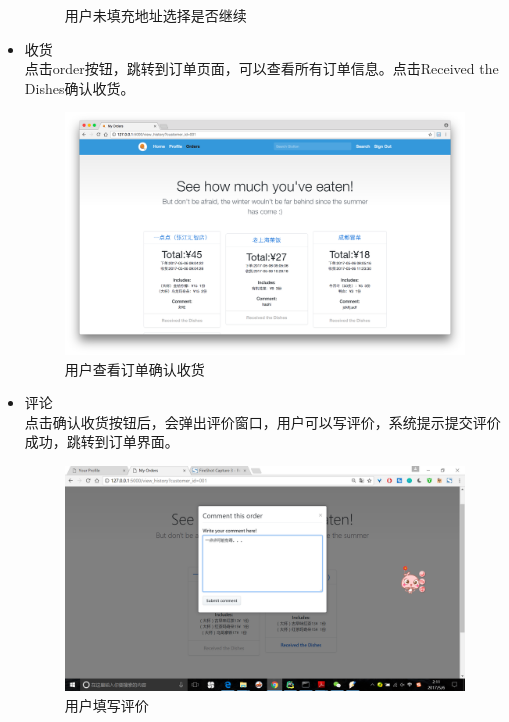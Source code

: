 \documentclass[12pt, oneside,a4paper]{article}
\begin{document}
\begin{itemize}
\begin{figure}[H]
     \caption{\small{用户未填充地址选择是否继续}}
  \end{figure}
  \item 收货\\
  点击order按钮，跳转到订单页面，可以查看所有订单信息。点击Received the Dishes确认收货。
  \begin{figure}[H]
   \centering
     \includegraphics[width=6.00in]{cu-order.jpg}
     \caption{\small{用户查看订单确认收货}}
  \end{figure}
  \item 评论\\
  点击确认收货按钮后，会弹出评价窗口，用户可以写评价，系统提示提交评价成功，跳转到订单界面。
  \begin{figure}[H]
   \centering
     \includegraphics[width=5.50in]{cu-comment.jpg}
     \caption{\small{用户填写评价}}
  \end{figure}
  \end{itemize}
\end{document}
